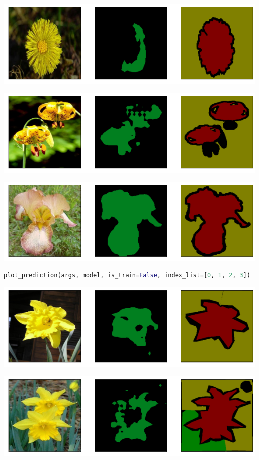 \documentclass{article}
\begin{document}
\includegraphics[width=\textwidth]{D2-2.1.2.png}

\includegraphics[width=\textwidth]{D2-2.1.3.png}

\includegraphics[width=\textwidth]{D2-2.1.4.png}

\begin{lstlisting}[language=Python]
plot_prediction(args, model, is_train=False, index_list=[0, 1, 2, 3])
\end{lstlisting}


\includegraphics[width=\textwidth]{D2-2.2.1.png}

\includegraphics[width=\textwidth]{D2-2.2.2.png}
\end{document}
